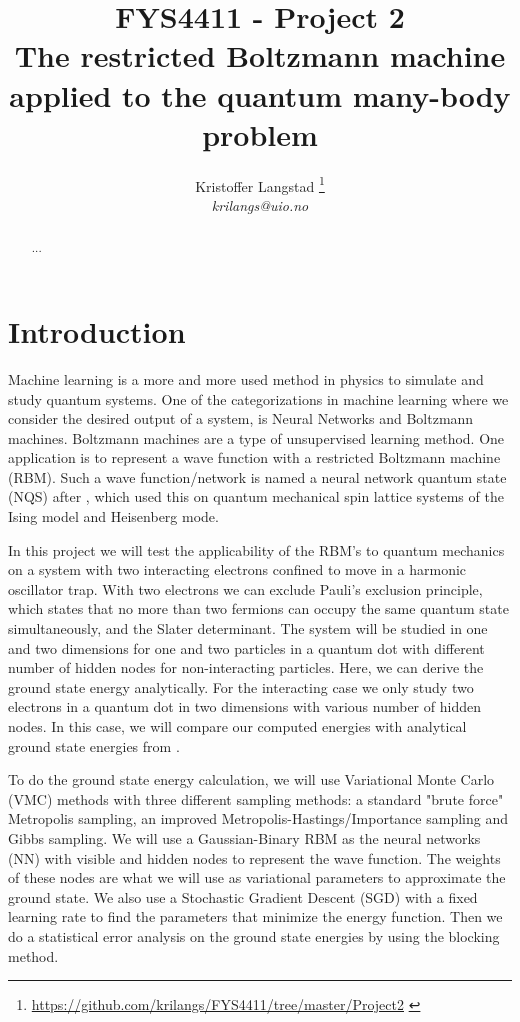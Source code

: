 \documentclass[12pt,a4paper,english]{article}
\title{FYS4411 - Project 2\\ The restricted Boltzmann machine applied to the quantum many-body problem}
\date{}
\author{ Kristoffer Langstad \footnote{\url{https://github.com/krilangs/FYS4411/tree/master/Project2} \cite{GitHub}}\\ \textit{krilangs@uio.no}}
\begin{document}
\maketitle
\begin{abstract}
	...
\end{abstract}


\section{Introduction}
\label{sect:Introduction}
Machine learning is a more and more used method in physics to simulate and study quantum systems. One of the categorizations in machine learning where we consider the desired output of a system, is Neural Networks and Boltzmann machines. Boltzmann machines are a type of unsupervised learning method. One application is to represent a wave function with a restricted Boltzmann machine (RBM). Such a wave function/network is named a neural network quantum state (NQS) after \citet{carleo2017solving}, which used this on quantum mechanical spin lattice systems of the Ising model and Heisenberg mode.

In this project we will test the applicability of the RBM's to quantum mechanics on a system with two interacting electrons confined to move in a harmonic oscillator trap. With two electrons we can exclude Pauli's exclusion principle, which states that no more than two fermions can occupy the same quantum state simultaneously, and the Slater determinant. The system will be studied in one and two dimensions for one and two particles in a quantum dot with different number of hidden nodes for non-interacting particles. Here, we can derive the ground state energy analytically. For the interacting case we only study two electrons in a quantum dot in two dimensions with various number of hidden nodes. In this case, we will compare our computed energies with analytical ground state energies from \citet{taut1993two}.

To do the ground state energy calculation, we will use Variational Monte Carlo (VMC) methods with three different sampling methods: a standard "brute force" Metropolis sampling, an improved Metropolis-Hastings/Importance sampling and Gibbs sampling. We will use a Gaussian-Binary RBM as the neural networks (NN) with visible and hidden nodes to represent the wave function. The weights of these nodes are what we will use as variational parameters to approximate the ground state. We also use a Stochastic Gradient Descent (SGD) with a fixed learning rate to find the parameters that minimize the energy function. Then we do a statistical error analysis on the ground state energies by using the blocking method.
\end{document}
